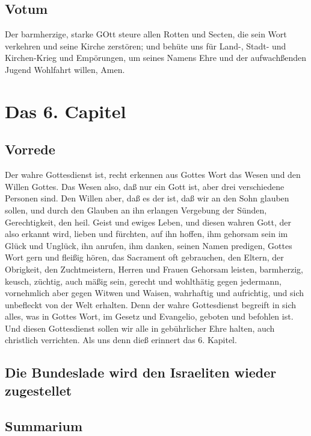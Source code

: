 \section{Votum}

Der barmherzige, starke GOtt steure allen Rotten und Secten, die sein Wort verkehren und seine Kirche zerstören; und behüte uns für Land-, Stadt- und Kirchen-Krieg und Empörungen, um seines Namens Ehre und der aufwachßenden Jugend Wohlfahrt willen, Amen.

\chapter{Das 6. Capitel}

\section{Vorrede}

Der wahre Gottesdienst ist, recht erkennen aus Gottes Wort das Wesen und den Willen Gottes. Das Wesen also, daß nur ein Gott ist, aber drei verschiedene Personen sind. Den Willen aber, daß es der ist, daß wir an den Sohn glauben sollen, und durch den Glauben an ihn erlangen Vergebung der Sünden, Gerechtigkeit, den heil. Geist und ewiges Leben, und diesen wahren Gott, der also erkannt wird, lieben und fürchten, auf ihn hoffen, ihm gehorsam sein im Glück und Unglück, ihn anrufen, ihm danken, seinen Namen predigen, Gottes Wort gern und fleißig hören, das Sacrament oft gebrauchen, den Eltern, der Obrigkeit, den Zuchtmeistern, Herren und Frauen Gehorsam leisten, barmherzig, keusch, züchtig, auch mäßig sein, gerecht und wohlthätig gegen jedermann, vornehmlich aber gegen Witwen und Waisen, wahrhaftig und aufrichtig, und sich unbefleckt von der Welt erhalten. Denn der wahre Gottesdienst begreift in sich alles, was in Gottes Wort, im Gesetz und Evangelio, geboten und befohlen ist. Und diesen Gottesdienst sollen wir alle in gebührlicher Ehre halten, auch christlich verrichten. Als uns denn dieß erinnert das 6. Kapitel.

\section{Die Bundeslade wird den Israeliten wieder zugestellet}

\section{Summarium}

